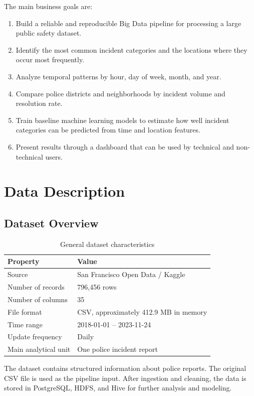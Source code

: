 \documentclass[12pt,a4paper]{article}
\begin{document}
The main business goals are:
\begin{enumerate}
    \item Build a reliable and reproducible Big Data pipeline for processing a large public safety dataset.
    \item Identify the most common incident categories and the locations where they occur most frequently.
    \item Analyze temporal patterns by hour, day of week, month, and year.
    \item Compare police districts and neighborhoods by incident volume and resolution rate.
    \item Train baseline machine learning models to estimate how well incident categories can be predicted from time and location features.
    \item Present results through a dashboard that can be used by technical and non-technical users.
\end{enumerate}

\section{Data Description}

\subsection{Dataset Overview}

\begin{table}[H]
\centering
\caption{General dataset characteristics}
\begin{tabular}{L{5cm} L{8cm}}
\toprule
\textbf{Property} & \textbf{Value} \\
\midrule
Source & San Francisco Open Data / Kaggle \\
Number of records & 796,456 rows \\
Number of columns & 35 \\
File format & CSV, approximately 412.9 MB in memory \\
Time range & 2018-01-01 -- 2023-11-24 \\
Update frequency & Daily \\
Main analytical unit & One police incident report \\
\bottomrule
\end{tabular}
\end{table}

The dataset contains structured information about police reports. The original CSV file is used as the pipeline input. After ingestion and cleaning, the data is stored in PostgreSQL, HDFS, and Hive for further analysis and modeling.
\end{document}
